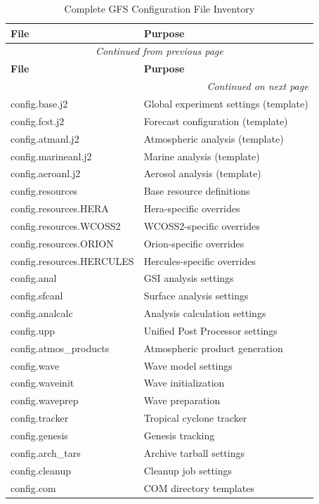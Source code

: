 \documentclass[11pt,letterpaper]{article}
\begin{document}
\begin{longtable}{@{}lp{8cm}@{}}
\caption{Complete GFS Configuration File Inventory} \\
\toprule
\textbf{File} & \textbf{Purpose} \\
\midrule
\endfirsthead
\multicolumn{2}{c}{\textit{Continued from previous page}} \\
\toprule
\textbf{File} & \textbf{Purpose} \\
\midrule
\endhead
\midrule
\multicolumn{2}{r}{\textit{Continued on next page}} \\
\endfoot
\bottomrule
\endlastfoot

config.base.j2 & Global experiment settings (template) \\
config.fcst.j2 & Forecast configuration (template) \\
config.atmanl.j2 & Atmospheric analysis (template) \\
config.marineanl.j2 & Marine analysis (template) \\
config.aeroanl.j2 & Aerosol analysis (template) \\
config.resources & Base resource definitions \\
config.resources.HERA & Hera-specific overrides \\
config.resources.WCOSS2 & WCOSS2-specific overrides \\
config.resources.ORION & Orion-specific overrides \\
config.resources.HERCULES & Hercules-specific overrides \\
config.anal & GSI analysis settings \\
config.sfcanl & Surface analysis settings \\
config.analcalc & Analysis calculation settings \\
config.upp & Unified Post Processor settings \\
config.atmos\_products & Atmospheric product generation \\
config.wave & Wave model settings \\
config.waveinit & Wave initialization \\
config.waveprep & Wave preparation \\
config.tracker & Tropical cyclone tracker \\
config.genesis & Genesis tracking \\
config.arch\_tars & Archive tarball settings \\
config.cleanup & Cleanup job settings \\
config.com & COM directory templates \\
\end{longtable}
\end{document}
